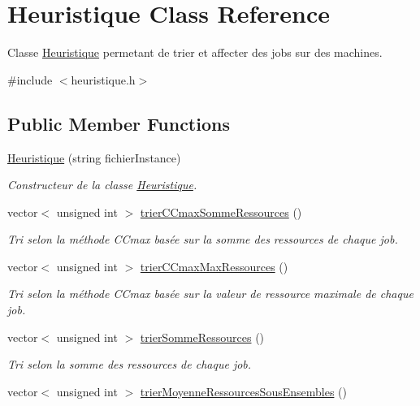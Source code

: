 \hypertarget{classHeuristique}{}\section{Heuristique Class Reference}
\label{classHeuristique}


Classe \hyperlink{classHeuristique}{Heuristique} permetant de trier et affecter des jobs sur des machines.  




{\ttfamily \#include $<$heuristique.\+h$>$}

\subsection*{Public Member Functions}
\begin{DoxyCompactItemize}
\item 
\hyperlink{classHeuristique_a58630433c6bac8eec9a5888945eba479}{Heuristique} (string fichier\+Instance)
\begin{DoxyCompactList}\small\item\em Constructeur de la classe \hyperlink{classHeuristique}{Heuristique}. \end{DoxyCompactList}\item 
vector$<$ unsigned int $>$ \hyperlink{classHeuristique_a38c390423fc2b190da599148ca879cd6}{trier\+C\+Cmax\+Somme\+Ressources} ()
\begin{DoxyCompactList}\small\item\em Tri selon la méthode C\+Cmax basée sur la somme des ressources de chaque job. \end{DoxyCompactList}\item 
vector$<$ unsigned int $>$ \hyperlink{classHeuristique_a02aae5127f941e55311e8bbd3b4afd3c}{trier\+C\+Cmax\+Max\+Ressources} ()
\begin{DoxyCompactList}\small\item\em Tri selon la méthode C\+Cmax basée sur la valeur de ressource maximale de chaque job. \end{DoxyCompactList}\item 
vector$<$ unsigned int $>$ \hyperlink{classHeuristique_a6101d6d238a7667b820b50629e4d497f}{trier\+Somme\+Ressources} ()
\begin{DoxyCompactList}\small\item\em Tri selon la somme des ressources de chaque job. \end{DoxyCompactList}\item 
vector$<$ unsigned int $>$ \hyperlink{classHeuristique_a4541884c49c13e08ee6c73c919388fd3}{trier\+Moyenne\+Ressources\+Sous\+Ensembles} ()

\end{DoxyCompactItemize}
